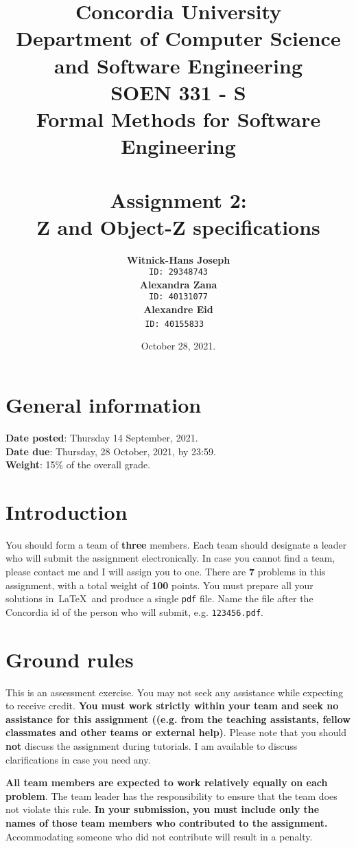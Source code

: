 \documentclass[12pt]{article}
\title{Concordia University\\
Department of Computer Science and Software Engineering\\
\textbf{SOEN 331 - S\\Formal Methods for Software Engineering}\\
\ \\
\textbf{Assignment 2: \\Z and Object-Z specifications}}
\author{\textbf{Witnick-Hans Joseph}\\
		\texttt{ID: 29348743}\\
		\textbf{Alexandra Zana}\\
		\texttt{ID: 40131077}\\
		\textbf{Alexandre Eid}\\
		\texttt{ID: 40155833}
\ \\}
\date{October 28, 2021.}
\begin{document}
\maketitle

\newpage
\tableofcontents
\newpage

\section{General information}

\noindent \textbf{Date posted}: Thursday 14 September, 2021.\\
\noindent \textbf{Date due}: Thursday, 28 October, 2021, by 23:59.\\
\noindent \textbf{Weight}: 15\% of the overall grade.

\section{Introduction}
You should form a team of \textbf{three} members. Each team should designate a leader who will submit the assignment electronically. In case you cannot find a team, please contact me and I will assign you to one. There are \textbf{7} problems in this assignment, with a total weight of \textbf{100} points. You must prepare all your solutions in~\LaTeX~and produce a single \texttt{pdf} file. Name the file after the Concordia id of the person who will submit, e.g. \texttt{123456.pdf}.

\section{Ground rules}

This is an assessment exercise.  You may not seek any assistance while expecting to receive credit. \textbf{You must work strictly within your team and seek no assistance for this assignment ((e.g. from the teaching assistants, fellow classmates and other teams or external help)}. Please note that you should \textbf{not} discuss the assignment during tutorials. I am available to discuss clarifications in case you need any.

\noindent \textbf{All team members are expected to work relatively equally on each problem}. The team leader has the responsibility to ensure that the team does not violate this rule. \textbf{In your submission, you must include only the names of those team members who contributed to the assignment.} Accommodating someone who did not contribute will result in a penalty.
\end{document}
